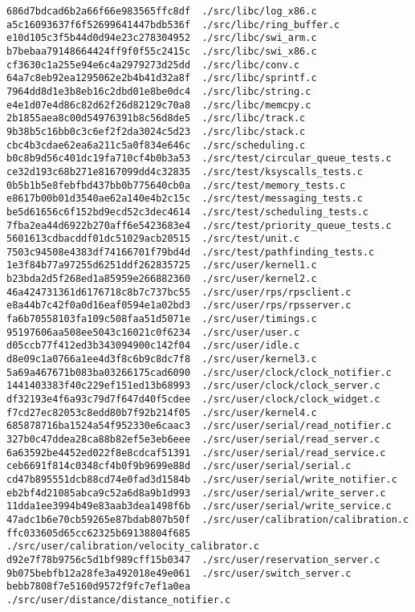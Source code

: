 \documentclass{article}
\begin{document}
\begin{verbatim}
686d7bdcad6b2a66f66e983565ffc8df  ./src/libc/log_x86.c
a5c16093637f6f52699641447bdb536f  ./src/libc/ring_buffer.c
e10d105c3f5b44d0d94e23c278304952  ./src/libc/swi_arm.c
b7bebaa79148664424ff9f0f55c2415c  ./src/libc/swi_x86.c
cf3630c1a255e94e6c4a2979273d25dd  ./src/libc/conv.c
64a7c8eb92ea1295062e2b4b41d32a8f  ./src/libc/sprintf.c
7964dd8d1e3b8eb16c2dbd01e8be0dc4  ./src/libc/string.c
e4e1d07e4d86c82d62f26d82129c70a8  ./src/libc/memcpy.c
2b1855aea8c00d54976391b8c56d8de5  ./src/libc/track.c
9b38b5c16bb0c3c6ef2f2da3024c5d23  ./src/libc/stack.c
cbc4b3cdae62ea6a211c5a0f834e646c  ./src/scheduling.c
b0c8b9d56c401dc19fa710cf4b0b3a53  ./src/test/circular_queue_tests.c
ce32d193c68b271e8167099dd4c32835  ./src/test/ksyscalls_tests.c
0b5b1b5e8febfbd437bb0b775640cb0a  ./src/test/memory_tests.c
e8617b00b01d3540ae62a140e4b2c15c  ./src/test/messaging_tests.c
be5d61656c6f152bd9ecd52c3dec4614  ./src/test/scheduling_tests.c
7fba2ea44d6922b270aff6e5423683e4  ./src/test/priority_queue_tests.c
5601613cdbacddf01dc51029acb20515  ./src/test/unit.c
7503c94508e4383df74166701f79bd4d  ./src/test/pathfinding_tests.c
1e3f84b77a97255d6251ddf262835725  ./src/user/kernel1.c
b23bda2d5f268ed1a85959e266882360  ./src/user/kernel2.c
46a424731361d6176718c8b7c737bc55  ./src/user/rps/rpsclient.c
e8a44b7c42f0a0d16eaf0594e1a02bd3  ./src/user/rps/rpsserver.c
fa6b70558103fa109c508faa51d5071e  ./src/user/timings.c
95197606aa508ee5043c16021c0f6234  ./src/user/user.c
d05ccb77f412ed3b343094900c142f04  ./src/user/idle.c
d8e09c1a0766a1ee4d3f8c6b9c8dc7f8  ./src/user/kernel3.c
5a69a467671b083ba03266175cad6090  ./src/user/clock/clock_notifier.c
1441403383f40c229ef151ed13b68993  ./src/user/clock/clock_server.c
df32193e4f6a93c79d7f647d40f5cdee  ./src/user/clock/clock_widget.c
f7cd27ec82053c8edd80b7f92b214f05  ./src/user/kernel4.c
685878716ba1524a54f952330e6caac3  ./src/user/serial/read_notifier.c
327b0c47ddea28ca88b82ef5e3eb6eee  ./src/user/serial/read_server.c
6a63592be4452ed022f8e8cdcaf51391  ./src/user/serial/read_service.c
ceb6691f814c0348cf4b0f9b9699e88d  ./src/user/serial/serial.c
cd47b895551dcb88cd74e0fad3d1584b  ./src/user/serial/write_notifier.c
eb2bf4d21085abca9c52a6d8a9b1d993  ./src/user/serial/write_server.c
11dda1ee3994b49e83aab3dea1498f6b  ./src/user/serial/write_service.c
47adc1b6e70cb59265e87bdab807b50f  ./src/user/calibration/calibration.c
ffc033605d65cc62325b69138804f685  ./src/user/calibration/velocity_calibrator.c
d92e7f78b9756c5d1bf989cff15b0347  ./src/user/reservation_server.c
9b075bebfb12a28fe3a492018e49e061  ./src/user/switch_server.c
bebb7808f7e5160d9572f9fc7ef1a0ea  ./src/user/distance/distance_notifier.c

\end{verbatim}
\end{document}

